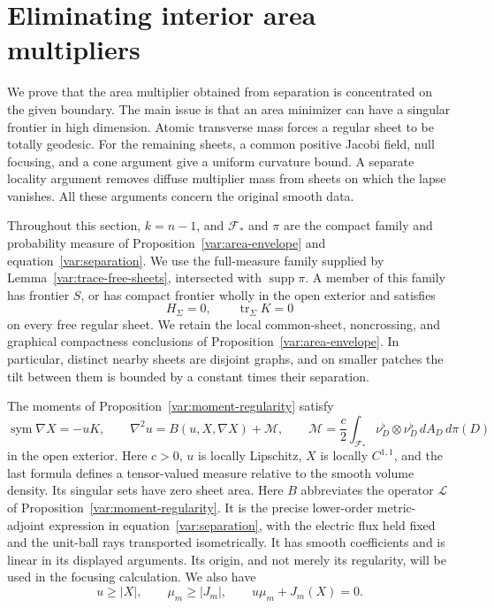 \section{Eliminating interior area multipliers}
\label{var:singular-multipliers}

We prove that the area multiplier obtained from separation is concentrated on
the given boundary.  The main issue is that an area minimizer can have a
singular frontier in high dimension.  Atomic transverse mass forces a regular
sheet to be totally geodesic.  For the remaining sheets, a common positive
Jacobi field, null focusing, and a cone argument give a uniform curvature
bound.  A separate locality argument removes diffuse multiplier mass from
sheets on which the lapse vanishes.  All these arguments concern the original
smooth data.

Throughout this section, $k=n-1$, and $\mathcal F_*$ and $\pi$ are the compact
family and probability measure of Proposition~\ref{var:area-envelope} and
equation~\ref{var:separation}.  We use the full-measure family supplied by
Lemma~\ref{var:trace-free-sheets}, intersected with $\operatorname{supp}\pi$.
A member of this family has frontier $S$,
or has compact frontier wholly in the open exterior and satisfies
\begin{equation}\label{var:zero-sheet-expansions}
 H_\Sigma=0,\qquad \operatorname{tr}_\Sigma K=0
\end{equation}
on every free regular sheet.  We retain the local common-sheet,
noncrossing, and graphical compactness conclusions of
Proposition~\ref{var:area-envelope}.  In particular, distinct nearby sheets
are disjoint graphs, and on smaller patches the tilt between them is bounded
by a constant times their separation.

The moments of Proposition~\ref{var:moment-regularity} satisfy
\begin{equation}\label{var:singular-system}
 \operatorname{sym}\nabla X=-uK,\qquad
 \nabla^2u=B(u,X,\nabla X)+\mathcal M,
 \qquad
 \mathcal M=\frac c2\int_{\mathcal F_*}
       \nu_D^\flat\otimes\nu_D^\flat\,dA_D\,d\pi(D)
\end{equation}
in the open exterior.  Here $c>0$, $u$ is locally Lipschitz, $X$ is locally
$C^{1,1}$, and the last formula defines a tensor-valued measure relative to
the smooth volume density.  Its singular sets have zero sheet area.
Here $B$ abbreviates the operator $\mathcal L$ of
Proposition~\ref{var:moment-regularity}.  It is the precise lower-order
metric-adjoint expression in
equation~\ref{var:separation}, with the electric flux held fixed and the
unit-ball rays transported isometrically.  It has smooth coefficients and
is linear in its displayed arguments.  Its origin, and not merely its
regularity, will be used in the focusing calculation.  We also have
\begin{equation}\label{var:singular-complementarity}
 u\geq |X|,\qquad \mu_m\geq |J_m|,\qquad
 u\mu_m+J_m(X)=0.
\end{equation}

